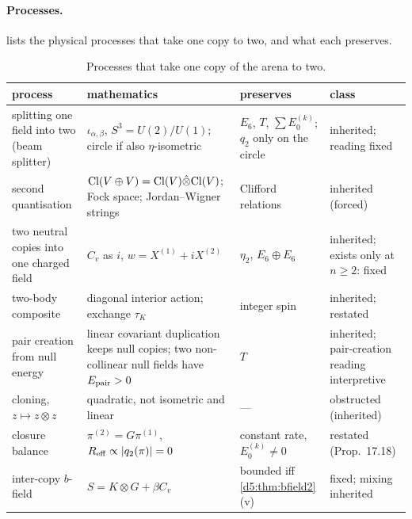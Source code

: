\paragraph{Processes.}  lists the physical processes that take one copy to two, and what each preserves.

\begin{table}[t]
\centering
\footnotesize
\begin{tabular}{@{}>{\raggedright\arraybackslash}p{3.3cm}>{\raggedright\arraybackslash}p{4.7cm}>{\raggedright\arraybackslash}p{4.3cm}>{\raggedright\arraybackslash}p{2.4cm}@{}}
\toprule
process & mathematics & preserves & class\\
\midrule
splitting one field into two (beam splitter) & $\iota_{\alpha,\beta}$, $S^3=U(2)/U(1)$; circle if also $\eta$-isometric & $E_6$, $T$, $\sum E_0^{(k)}$; $q_2$ only on the circle & inherited; reading fixed\\
second quantisation & $\mathrm{Cl}(V\oplus V)=\mathrm{Cl}(V)\hat\otimes\mathrm{Cl}(V)$; Fock space; Jordan--Wigner strings & Clifford relations & inherited (forced)\\
two neutral copies into one charged field & $C_v$ as $i$, $w=X^{(1)}+iX^{(2)}$ & $\eta_2$, $E_6\oplus E_6$ & inherited; exists only at $n\ge2$: fixed\\
two-body composite & diagonal interior action; exchange $\tau_K$ & integer spin & inherited; restated\\
pair creation from null energy & linear covariant duplication keeps null copies; two non-collinear null fields have $E_{\rm pair}>0$ & $T$ & inherited; pair-creation reading interpretive\\
cloning, $z\mapsto z\otimes z$ & quadratic, not isometric and linear & --- & obstructed (inherited)\\
closure balance & $\pi^{(2)}=G\pi^{(1)}$, $R_{\rm eff}\propto|q_2(\pi)|=0$ & constant rate, $E_0^{(k)}\neq0$ & restated (Prop.~17.18)\\
inter-copy $b$-field & $S=K\otimes G+\beta C_v$ & bounded iff \cref{d5:thm:bfield2}(v) & fixed; mixing inherited\\
\bottomrule
\end{tabular}
\caption{Processes that take one copy of the arena to two.}
\label{d5:tab:processes}
\end{table}

